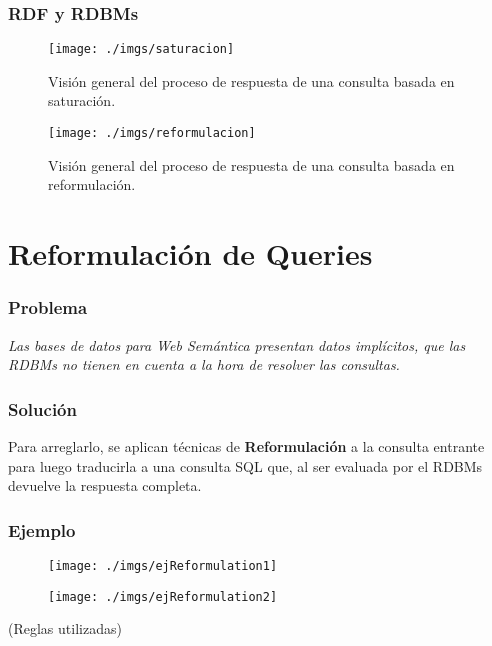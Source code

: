 \documentclass{beamer}
\begin{document}
\begin{frame}
\frametitle{RDF y RDBMs}

\begin{figure}[h]
\begin{center}
\texttt{[image: ./imgs/saturacion]}
\caption{Visión general del proceso de respuesta de una consulta basada en saturación.}
\end{center}
\end{figure}

\begin{figure}[H]
\begin{center}
\texttt{[image: ./imgs/reformulacion]}
\caption{Visión general del proceso de respuesta de una consulta basada en reformulación.}
\end{center}
\end{figure}
\end{frame}

\section{Reformulación de Queries}
\begin{frame}
\frametitle{Problema}
\centering
\textit{Las bases de datos para Web Semántica presentan datos implícitos, que las RDBMs no tienen en cuenta a la hora de resolver las consultas.}
\end{frame}	

\begin{frame}
\frametitle{Solución}
Para arreglarlo, se aplican técnicas de \textbf{Reformulación} a la consulta entrante para luego traducirla a una consulta SQL que, al ser evaluada por el RDBMs devuelve la respuesta completa.
\end{frame}	


\begin{frame}
\frametitle{Ejemplo}
\begin{figure}[H]
\begin{center}
\texttt{[image: ./imgs/ejReformulation1]}
\end{center}
\end{figure}

\begin{figure}[H]
\begin{center}
\texttt{[image: ./imgs/ejReformulation2]}
\end{center}
\end{figure}

\begin{center}
(Reglas utilizadas)
\end{center}

\end{frame}	
\end{document}
